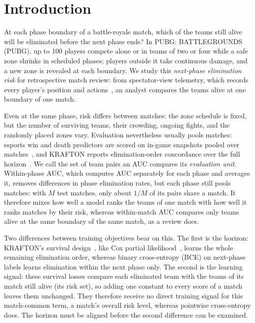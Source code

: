 \documentclass[sigconf,anonymous]{acmart}
\begin{document}
\section{Introduction}
\label{sec:introduction}
At each phase boundary of a battle-royale match, which of the teams still alive will be eliminated before the next phase ends? In PUBG: BATTLEGROUNDS (PUBG), up to 100 players compete alone or in teams of two or four while a safe zone shrinks in scheduled phases; players outside it take continuous damage, and a new zone is revealed at each boundary. We study this \emph{next-phase elimination risk} for retrospective match review: from spectator-view telemetry, which records every player's position and actions~\cite{PUBGAPI}, an analyst compares the teams alive at one boundary of one match.

Even at the same phase, risk differs between matches: the zone schedule is fixed, but the number of surviving teams, their crowding, ongoing fights, and the randomly placed zones vary. Evaluation nevertheless usually pools matches: esports win and death predictors are scored on in-game snapshots pooled over matches~\cite{Hodge21,Katona19,Marshall22}, and KRAFTON reports elimination-order concordance over the full horizon~\cite{KRAFTON}. We call the set of team pairs an AUC compares its \emph{evaluation unit}. Within-phase AUC, which computes AUC separately for each phase and averages it, removes differences in phase elimination rates, but each phase still pools matches: with $M$ test matches, only about $1/M$ of its pairs share a match. It therefore mixes how well a model ranks the teams of one match with how well it ranks matches by their risk, whereas within-match AUC compares only teams alive at the same boundary of the same match, as a review does.

Two differences between training objectives bear on this. The first is the horizon: KRAFTON's survival design~\cite{KRAFTON}, like Cox partial likelihood~\cite{Cox72}, learns the whole remaining elimination order, whereas binary cross-entropy (BCE) on next-phase labels learns elimination within the next phase only. The second is the learning signal: these survival losses compare each eliminated team with the teams of its match still alive (its risk set), so adding one constant to every score of a match leaves them unchanged. They therefore receive no direct training signal for this match-common term, a match's overall risk level, whereas pointwise cross-entropy does. The horizon must be aligned before the second difference can be examined.
\end{document}

